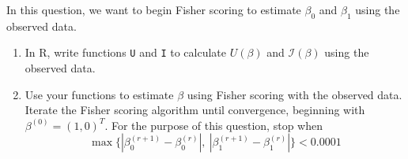 \documentclass[11pt]{article}
\begin{document}
\begin{enumerate}
In this question, we want to begin Fisher scoring to estimate $\beta_0$ and $\beta_1$ using the observed data.

\begin{enumerate}
\item In R, write functions \verb;U; and \verb;I; to calculate $U(\beta)$ and $\mathcal{I}(\beta)$ using the observed data.

\item Use your functions to estimate $\beta$ using Fisher scoring with the observed data. Iterate the Fisher scoring algorithm until convergence, beginning with $\beta^{(0)} = (1, 0)^T$. For the purpose of this question, stop when 
$$\max \{ |\beta_0^{(r+1)} - \beta_0^{(r)}|, \ |\beta_1^{(r+1)} - \beta_1^{(r)}| \} < 0.0001$$
\end{enumerate}

\end{enumerate}
\end{document}
